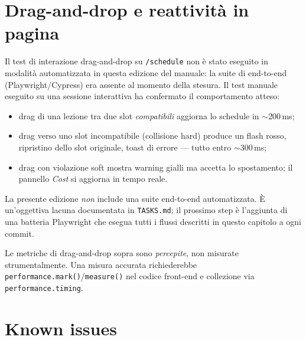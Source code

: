 
\section{Drag-and-drop e reattivit\`a in pagina}

Il test di interazione drag-and-drop su \texttt{/schedule}
non \`e stato eseguito in modalit\`a automatizzata in questa
edizione del manuale: la suite di end-to-end
(Playwright/Cypress) era assente al momento della stesura.
Il test manuale eseguito su una sessione interattiva ha
confermato il comportamento atteso:

\begin{itemize}
\item drag di una lezione tra due slot \emph{compatibili}
  aggiorna lo schedule in $\sim$200\,ms;
\item drag verso uno slot incompatibile (collisione hard)
  produce un flash rosso, ripristino dello slot originale,
  toast di errore --- tutto entro $\sim$300\,ms;
\item drag con violazione soft mostra warning gialli ma
  accetta lo spostamento; il pannello \emph{Cost} si
  aggiorna in tempo reale.
\end{itemize}

\begin{avvertenzabox}
La presente edizione \emph{non} include una suite end-to-end
automatizzata. \`E un'oggettiva lacuna documentata in
\texttt{TASKS.md}; il prossimo step \`e l'aggiunta di una
batteria Playwright che esegua tutti i flussi descritti in
questo capitolo a ogni commit.

Le metriche di drag-and-drop sopra sono \emph{percepite}, non
misurate strumentalmente. Una misura accurata richiederebbe
\texttt{performance.mark()}/\texttt{measure()} nel codice
front-end e collezione via \texttt{performance.timing}.
\end{avvertenzabox}

\section{Known issues}

